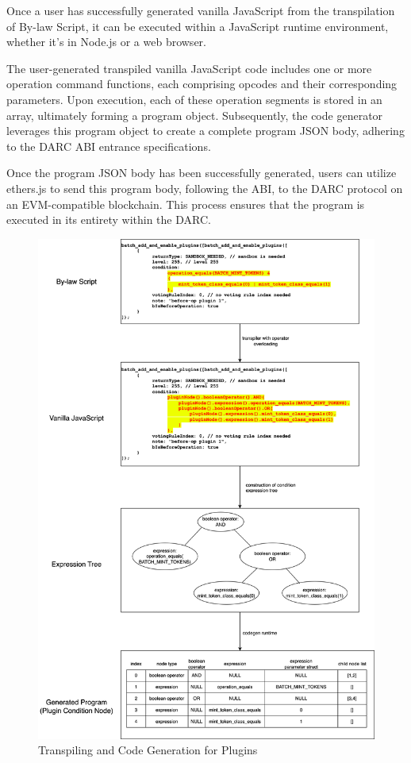 \documentclass[main.tex]{subfiles}
\begin{document}
Once a user has successfully generated vanilla JavaScript from the transpilation of By-law Script, it can be executed within a JavaScript runtime environment, whether it's in Node.js or a web browser.

The user-generated transpiled vanilla JavaScript code includes one or more operation command functions, each comprising opcodes and their corresponding parameters. Upon execution, each of these operation segments is stored in an array, ultimately forming a program object. Subsequently, the code generator leverages this program object to create a complete program JSON body, adhering to the DARC ABI entrance specifications.

Once the program JSON body has been successfully generated, users can utilize ethers.js to send this program body, following the ABI, to the DARC protocol on an EVM-compatible blockchain. This process ensures that the program is executed in its entirety within the DARC.

\begin{figure}
\centering
\includegraphics[width=1\linewidth]{by-law-script-process.drawio.png}
\caption{\label{fig:by-law-plugin}Transpiling and Code Generation for Plugins}
\end{figure}
\end{document}
